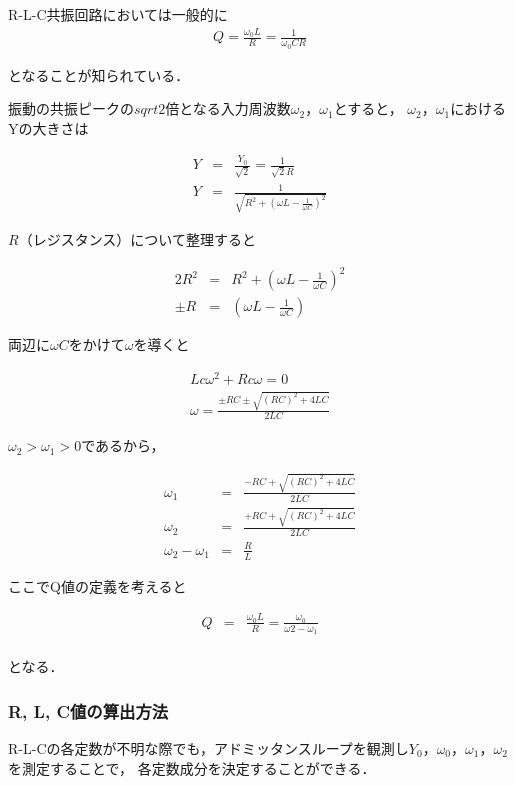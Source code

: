 \documentclass[dvipdfmx,titlepage,a4j]{jsarticle}  %
\numberwithin{equation}{section}
\begin{document}
R-L-C共振回路においては一般的に
\begin{eqnarray}
  Q = \frac{\omega_0 L}{R} = \frac{1}{\omega_0 CR}
\end{eqnarray}

となることが知られている．

振動の共振ピークの$sqrt{2}$倍となる入力周波数$\omega_2$，$\omega_1$とすると，
$\omega_2$，$\omega_1$におけるYの大きさは

\begin{eqnarray}
  Y &=& \frac{Y_0}{\sqrt{2}} = \frac{1}{\sqrt{2}R} \\
  Y &=& \frac{1}{\sqrt{R^2 + (\omega L - \frac{1}{\omega C})^2}}
\end{eqnarray}

$R$（レジスタンス）について整理すると

\begin{eqnarray}
  2R^2 &=& R^2 + (\omega L - \frac{1}{\omega C})^2 \\
  \pm R &=& (\omega L - \frac{1}{\omega C})
\end{eqnarray}

両辺に$\omega C$をかけて$\omega$を導くと

\begin{eqnarray}
  Lc \omega^2 + Rc\omega = 0\\
  \omega = \frac{\pm RC \pm \sqrt{(RC)^2 + 4LC}}{2LC}
\end{eqnarray}

$\omega_2 > \omega_1 > 0$であるから，

\begin{eqnarray}
  \omega_1 &=& \frac{-RC + \sqrt{(RC)^2 + 4LC}}{2LC} \\
  \omega_2 &=& \frac{+RC + \sqrt{(RC)^2 + 4LC}}{2LC} \\
  \omega_2 - \omega_1 &=& \frac{R}{L}
\end{eqnarray}

ここでQ値の定義を考えると

\begin{eqnarray}
  Q &=& \frac{\omega_0 L}{R} = \frac{\omega_0}{\omega2 - \omega_1}\\
\end{eqnarray}

となる．

\subsubsection{R, L, C値の算出方法}
R-L-Cの各定数が不明な際でも，アドミッタンスループを観測し$Y_0$，$\omega_0$，$\omega_1$，$\omega_2$を測定することで，
各定数成分を決定することができる．
\end{document}
